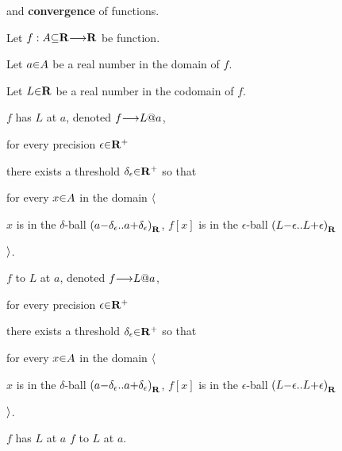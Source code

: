\vs
{} and {\bf convergence} of functions. \par  %
Let $f: A\p\subseteq\R \to \R$ be function. \par
Let $a \p\in A$  be a real number in the domain   of $f$. \par
Let $L \p\in \R$ be a real number in the codomain of $f$. \par
   $f$ has  $L$ at $a$, denoted $f \to L \p@ a$,  \par
      \hs\hs\hs for every precision $\epsilon \p\in \R^+$ \par
      \hs\hs\hs\hs there exists a threshold $\delta_\epsilon \p\in \R^+$ so that \par
      \hs\hs\hs\hs\hs for every $x \p\in A$ in the domain $\a\langle$ \par
      \hs\hs\hs\hs\hs\hs {} $x$ is in the $\delta$-ball $\a(a\p-\delta_\epsilon \a{..} a\p+\delta_\epsilon\a)_\R$,  $f[x]$ is in the $\epsilon$-ball $\a(L\p-\epsilon \a{..} L\p+\epsilon\a)_\R$ \par
      \hs\hs\hs\hs\hs $\a\rangle$. \par
   $f$  to $L$ at $a$, denoted $f \to L \p@ a$,  \par
      \hs\hs\hs for every precision $\epsilon \p\in \R^+$ \par
      \hs\hs\hs\hs there exists a threshold $\delta_\epsilon \p\in \R^+$ so that \par
      \hs\hs\hs\hs\hs for every $x \p\in A$ in the domain $\a\langle$ \par
      \hs\hs\hs\hs\hs\hs {} $x$ is in the $\delta$-ball $\a(a\p-\delta_\epsilon \a{..} a\p+\delta_\epsilon\a)_\R$,  $f[x]$ is in the $\epsilon$-ball $\a(L\p-\epsilon \a{..} L\p+\epsilon\a)_\R$ \par
      \hs\hs\hs\hs\hs $\a\rangle$. \par
   $f$ has  $L$ at $a$  $f$  to $L$ at $a$. \par



